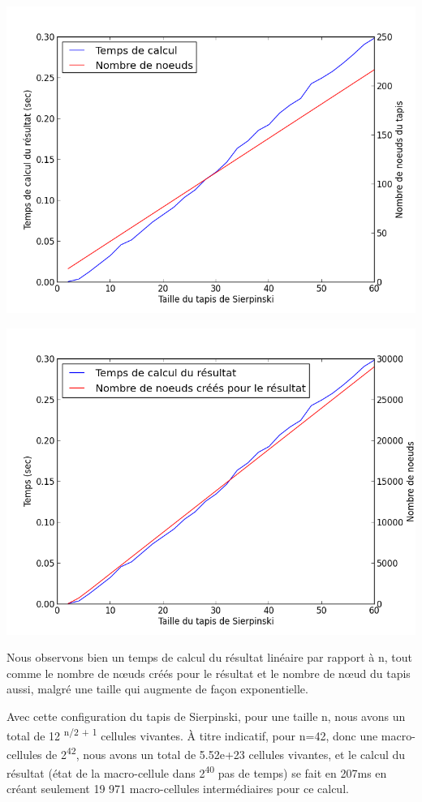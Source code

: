 \documentclass[a4paper,12pt]{report}
\begin{document}
\begin{center}
  \includegraphics[scale=0.65]{carpet_time_cnt.png}
\end{center}
\begin{center}
  \includegraphics[scale=0.65]{carpet_time_created.png}
\end{center}

Nous observons bien un temps de calcul du résultat linéaire par
rapport à n, tout comme le nombre de n\oe uds créés pour le résultat et
le nombre de n\oe ud du tapis aussi, malgré une taille qui augmente de
façon exponentielle.

Avec cette configuration du tapis de Sierpinski, pour une taille n,
nous avons un total de 12\textsuperscript{ n/2 + 1} cellules
vivantes. À titre indicatif, pour n=42, donc une macro-cellules de
2\textsuperscript{42}, nous avons un total de 5.52e+23 cellules
vivantes, et le calcul du résultat (état de la macro-cellule dans
2\textsuperscript{40} pas de temps) se fait en 207ms en créant
seulement 19 971 macro-cellules intermédiaires pour ce calcul.
\end{document}
